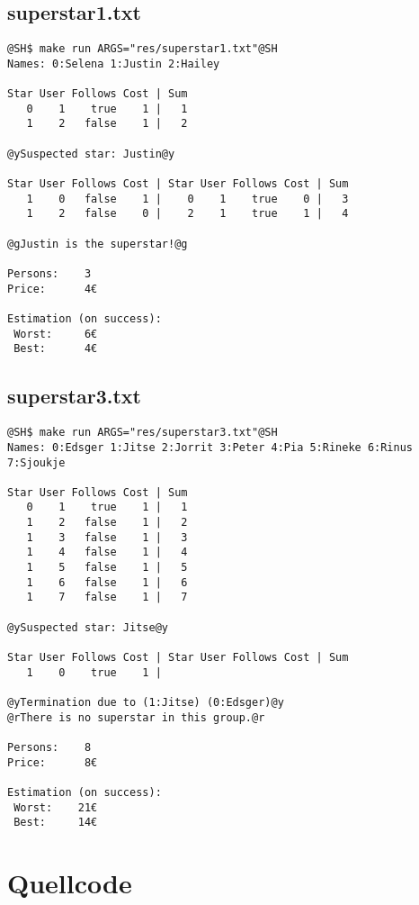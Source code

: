 \documentclass[a4paper,10pt,ngerman]{scrartcl}
\begin{document}
\subsection{superstar1.txt}
\begin{lstlisting}
@SH$ make run ARGS="res/superstar1.txt"@SH
Names: 0:Selena 1:Justin 2:Hailey

Star User Follows Cost | Sum
   0    1    true    1 |   1
   1    2   false    1 |   2

@ySuspected star: Justin@y

Star User Follows Cost | Star User Follows Cost | Sum
   1    0   false    1 |    0    1    true    0 |   3
   1    2   false    0 |    2    1    true    1 |   4

@gJustin is the superstar!@g

Persons:    3
Price:      4€

Estimation (on success):
 Worst:     6€
 Best:      4€
\end{lstlisting}

\subsection{superstar3.txt}
\begin{lstlisting}
@SH$ make run ARGS="res/superstar3.txt"@SH
Names: 0:Edsger 1:Jitse 2:Jorrit 3:Peter 4:Pia 5:Rineke 6:Rinus 7:Sjoukje

Star User Follows Cost | Sum
   0    1    true    1 |   1
   1    2   false    1 |   2
   1    3   false    1 |   3
   1    4   false    1 |   4
   1    5   false    1 |   5
   1    6   false    1 |   6
   1    7   false    1 |   7

@ySuspected star: Jitse@y

Star User Follows Cost | Star User Follows Cost | Sum
   1    0    true    1 |

@yTermination due to (1:Jitse) (0:Edsger)@y
@rThere is no superstar in this group.@r

Persons:    8
Price:      8€

Estimation (on success):
 Worst:    21€
 Best:     14€
\end{lstlisting}


\pagebreak
\section{Quellcode}
\end{document}
